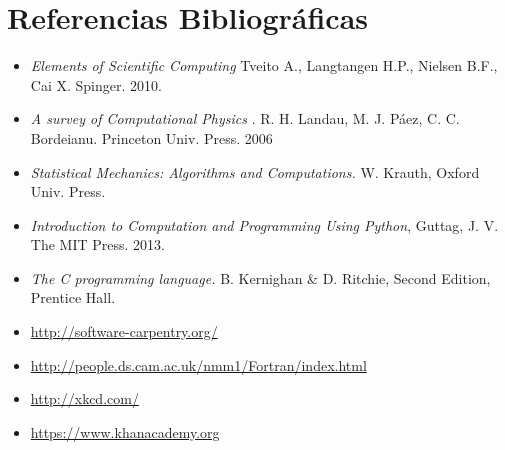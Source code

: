 \documentclass[11pt]{article}
\begin{document}
\section*{Referencias Bibliogr\'aficas}

\begin{itemize}
\item
\textit{Elements of Scientific Computing}
Tveito A., Langtangen H.P., Nielsen B.F., Cai X. Spinger. 2010.
\item
\textit{A survey of Computational Physics}
. R. H. Landau, M. J. P\'aez, C. C. Bordeianu. Princeton Univ. Press. 2006
\item 
\textit{Statistical Mechanics: Algorithms and Computations.}
W. Krauth, Oxford Univ. Press. 
\item 
\textit{Introduction to Computation and Programming Using Python},
Guttag, J. V. The MIT Press. 2013.
\item 
\textit{The C programming language.}
 B. Kernighan \& D. Ritchie, Second Edition, Prentice Hall.
\item\url{http://software-carpentry.org/}
\item\url{http://people.ds.cam.ac.uk/nmm1/Fortran/index.html}
\item\url{http://xkcd.com/}
\item\url{https://www.khanacademy.org}
\end{itemize}

 
\end{document}
